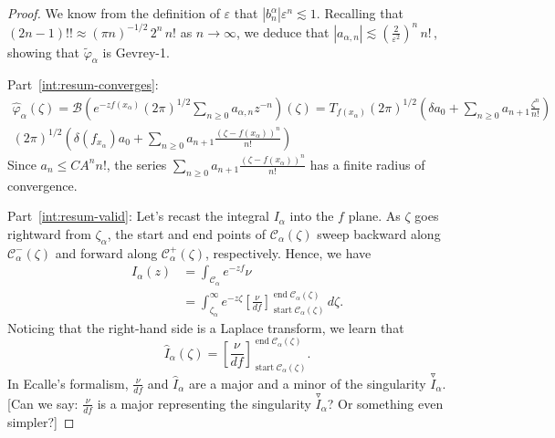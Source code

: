 \documentclass{article}
\theoremstyle{definition}
\newcommand{\borel}{\mathcal{B}}
\begin{document}
\begin{proof}
We know from the definition of $\varepsilon$ that $\left|b_n^\alpha\right| \varepsilon^n \lesssim 1$. Recalling that $(2n - 1)!! \approx (\pi n)^{-1/2}\,2^n\,n!$ as $n \to \infty$, we deduce that $|a_{\alpha,n}| \lesssim \left(\tfrac{2}{\varepsilon^2}\right)^n\,n!\,$, showing that $\tilde{\varphi}_\alpha$ is Gevrey-1.

Part~\eqref{int:resum-converges}: \begin{align*}
\hat{\varphi}_\alpha(\zeta)=\borel\left(e^{-zf(x_\alpha)}(2\pi)^{1/2} \sum_{n\geq 0}a_{\alpha,n}z^{-n}\right)(\zeta)=T_{f(x_\alpha)}(2\pi)^{1/2} \left(\delta a_0+\sum_{n\geq 0}a_{n+1}\frac{\zeta^n}{n!}\right)\\
(2\pi)^{1/2} \left(\delta(f_{x_\alpha}) a_0+\sum_{n\geq 0}a_{n+1}\frac{(\zeta-f(x_\alpha))^n}{n!}\right)
\end{align*}
Since $a_{n}\leq CA^nn!$, the series $\sum_{n\geq 0}a_{n+1}\frac{(\zeta-f(x_\alpha))^n}{n!}$ has a finite radius of convergence. 

Part~\eqref{int:resum-valid}: Let's recast the integral $I_\alpha$ into the $f$ plane. As $\zeta$ goes rightward from $\zeta_\alpha$, the start and end points of $\mathcal{C}_\alpha(\zeta)$ sweep backward along $\mathcal{C}^-_\alpha(\zeta)$ and forward along $\mathcal{C}^+_\alpha(\zeta)$, respectively. Hence, we have
\begin{align*}
I_\alpha(z) & = \int_{\mathcal{C}_{\alpha}} e^{-zf} \nu \\
& = \int_{\zeta_\alpha}^\infty e^{-z\zeta} \left[\frac{\nu}{df}\right]_{\operatorname{start} \mathcal{C}_\alpha(\zeta)}^{\operatorname{end} \mathcal{C}_\alpha(\zeta)}\,d\zeta.
\end{align*}
Noticing that the right-hand side is a Laplace transform, we learn that
\begin{equation}\label{thimble-difference}
\hat{I}_\alpha(\zeta) = \left[\frac{\nu}{df}\right]_{\operatorname{start} \mathcal{C}_\alpha(\zeta)}^{\operatorname{end} \mathcal{C}_\alpha(\zeta)}.
\end{equation}
\color{Aquamarine}
In Ecalle's formalism, $\frac{\nu}{df}$ and $\hat{I}_\alpha$ are a major and a minor of the singularity $\overset{\triangledown}{I}_\alpha$. [Can we say: $\frac{\nu}{df}$ is a major representing the singularity $\overset{\triangledown}{I}_\alpha$? Or something even simpler?]
\color{black}


\end{proof}
\end{document}
